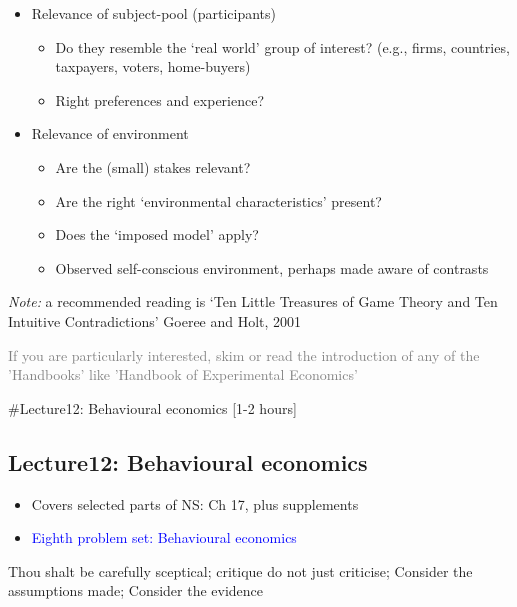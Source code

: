 \documentclass[]{article}
\providecommand{\tightlist}{%
  \setlength{\itemsep}{0pt}\setlength{\parskip}{0pt}}
\begin{document}
\begin{itemize}
\tightlist
\item
  Relevance of subject-pool (participants)

  \begin{itemize}
  \tightlist
  \item
    Do they resemble the `real world' group of interest? (e.g., firms,
    countries, taxpayers, voters, home-buyers)
  \item
    Right preferences and experience?
  \end{itemize}
\item
  Relevance of environment

  \begin{itemize}
  \tightlist
  \item
    Are the (small) stakes relevant?
  \item
    Are the right `environmental characteristics' present?
  \item
    Does the `imposed model' apply?
  \item
    Observed self-conscious environment, perhaps made aware of contrasts
  \end{itemize}
\end{itemize}

\emph{Note:} a recommended reading is `Ten Little Treasures of Game
Theory and Ten Intuitive Contradictions' Goeree and Holt, 2001

\textcolor{gray}{If you are particularly interested, skim or read the introduction of any of the 'Handbooks' like 'Handbook of Experimental Economics'}

\#Lecture12: Behavioural economics {[}1-2 hours{]}

\hypertarget{lecture12-behavioural-economics}{%
\subsection{Lecture12: Behavioural
economics}\label{lecture12-behavioural-economics}}

\begin{itemize}
\item
  Covers selected parts of NS: Ch 17, plus supplements
\item
  \textcolor{blue}{Eighth problem set: Behavioural economics}
\end{itemize}

Thou shalt be carefully sceptical; critique do not just criticise;
Consider the assumptions made; Consider the evidence
\end{document}
